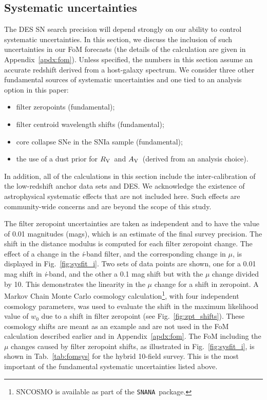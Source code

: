\documentclass[preprint2]{aastex}    %
\newcommand\rv{$R_{\rm V}$}
\newcommand\av{$A_{\rm V}$}
\newcommand{\snana}{{\tt SNANA}}
\begin{document}
\subsection{Systematic uncertainties}\label{sec:sysunc}
The DES SN search precision will depend strongly on our
ability to control 
systematic uncertainties. In this section, we discuss the
inclusion of such uncertainties in our FoM forecasts 
(the details of the calculation are given in Appendix~\ref{apdx:fom}). 
Unless specified, the numbers in this section assume an accurate redshift
derived from a host-galaxy spectrum.  
We consider three other fundamental sources of systematic uncertainties 
and one tied to an analysis option in this paper: 
\begin{itemize}
\item filter zeropoints (fundamental);
\item filter centroid wavelength shifts (fundamental);
\item core collapse SNe in the SNIa sample (fundamental); 
\item the use of a dust prior for \rv\ and \av\ (derived from 
an analysis choice). 
\end{itemize} 
In addition, all of the calculations in this section include 
the inter-calibration of the low-redshift anchor data sets and DES.
We acknowledge the existence of astrophysical systematic effects that 
are not included here. Such effects are community-wide concerns and are beyond
the scope of this study.  

The filter zeropoint uncertainties are taken as independent and 
to have the value of 0.01 magnitudes (mags), which is an estimate 
of the final survey precision. 
The shift in the distance modulus is computed for each filter 
zeropoint change.  The effect of a change in the \textit{i}-band 
filter, and the corresponding change in $\mu$, 
is displayed in Fig.~\ref{fig:sysfit_i}.
Two sets of data points are shown,  one for a 0.01 mag 
shift in \textit{i}-band, and the other a 0.1 mag shift but with 
the $\mu$ change divided by 10.  This demonstrates the 
linearity in the $\mu$ change for a shift in zeropoint.
A Markov Chain Monte Carlo cosmology calculation\footnote{SNCOSMO 
is available as part of the \snana\ package.},  with four independent
cosmology parameters, was used to evaluate the shift in 
the maximum likelihood value of $w_0$ due to a shift in filter zeropoint (see Fig.~\ref{fig:zpt_shifts}).  
These cosmology shifts are meant as an example and are not used in 
the FoM calculation described earlier and in Appendix~\ref{apdx:fom}.  
The FoM including the $\mu$ changes caused by filter 
zeropoint shifts, as illustrated in Fig.~\ref{fig:sysfit_i}, is 
shown in Tab.~\ref{tab:fomsys} for the hybrid 10-field survey.
This is the
most important of the fundamental systematic uncertainties listed above.
\end{document}
